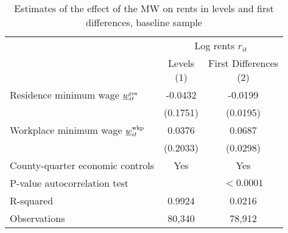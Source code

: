 \begin{table}[hbt!] \centering
    \caption{Estimates of the effect of the MW on rents in levels and first differences,
             baseline sample}
    \label{tab:autocorrelation}
    \begin{tabular}{@{}lcc@{}}
        \toprule
            & \multicolumn{2}{c}{Log rents $r_{it}$}                    \\ \cmidrule(l){2-3} 
            & \shortstack{Levels\\(1)} 
            & \shortstack{First Differences\\(2)}                       \\ \midrule
        Residence minimum wage $\underline{w}^{\text{res}}_{it}$    &  -0.0432   &  -0.0199              \\
                                                    & (0.1751)  & (0.0195)             \\
        Workplace minimum wage $\underline{w}^{\text{wkp}}_{it}$    &  0.0376   &  0.0687              \\
                                                    & (0.2033)  & (0.0298)             \\ \midrule
        County-quarter economic controls            &  Yes   &  Yes              \\
        P-value autocorrelation test                &        &  $<0.0001$        \\
        R-squared                                   &  0.9924   &  0.0216              \\
        Observations                                &  80,340  &  78,912             \\ \bottomrule
    \end{tabular}


\end{table}
